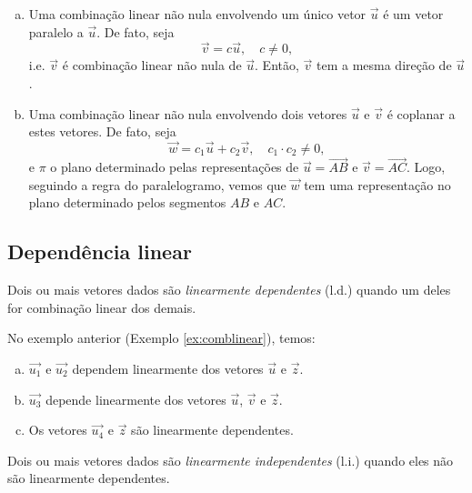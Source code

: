 \begin{obs}
  \begin{enumerate}[a)]
  \item Uma combinação linear não nula envolvendo um único vetor $\vec{u}$ é um vetor paralelo a $\vec{u}$. De fato, seja
    \begin{equation}
      \vec{v} = c\vec{u},\quad c\neq 0,
    \end{equation}
    i.e. $\vec{v}$ é combinação linear não nula de $\vec{u}$. Então, $\vec{v}$ tem a mesma direção de $\vec{u}$.
  \item Uma combinação linear não nula envolvendo dois vetores $\vec{u}$ e $\vec{v}$ é coplanar a estes vetores. De fato, seja
    \begin{equation}
      \vec{w} = c_1\vec{u} + c_2\vec{v},\quad c_1\cdot c_2 \neq 0,
    \end{equation}
    e $\pi$ o plano determinado pelas representações de $\vec{u} = \overrightarrow{AB}$ e $\vec{v} = \overrightarrow{AC}$. Logo, seguindo a regra do paralelogramo, vemos que $\vec{w}$ tem uma representação no plano determinado pelos segmentos $AB$ e $AC$.
  \end{enumerate}
\end{obs}

\subsection{Dependência linear}\label{cap_base_subsec_deplin}

Dois ou mais vetores dados são \emph{linearmente dependentes} (l.d.) quando um deles for combinação linear dos demais.

\begin{ex}\label{ex:deplinear}
  No exemplo anterior (Exemplo \ref{ex:comblinear}), temos:
  \begin{enumerate}[a)]
  \item $\vec{u_1}$ e $\vec{u_2}$ dependem linearmente dos vetores $\vec{u}$ e $\vec{z}$.
  \item $\vec{u_3}$ depende linearmente dos vetores $\vec{u}$, $\vec{v}$ e $\vec{z}$.
  \item Os vetores $\vec{u_4}$ e $\vec{z}$ são linearmente dependentes.
  \end{enumerate}
\end{ex}

Dois ou mais vetores dados são \emph{linearmente independentes} (l.i.) quando eles não são linearmente dependentes.

